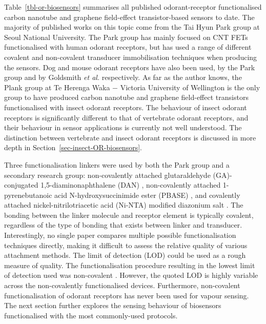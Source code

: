 \documentclass[
  a4paper,
]{scrbook}
\begin{document}
Table~\ref{tbl-or-biosensors} summarises all published odorant-receptor
functionalised carbon nanotube and graphene field-effect
transistor-based sensors to date. The majority of published works on
this topic come from the Tai Hyun Park group at Seoul National
University. The Park group has mainly focused on CNT FETs functionalised
with human odorant receptors, but has used a range of different covalent
and non-covalent transducer immobilisation techniques when producing the
sensors. Dog and mouse odorant receptors have also been used, by the
Park group and by Goldsmith \emph{et al.} respectively. As far as the
author knows, the Plank group at Te Herenga Waka \(-\) Victoria
University of Wellington is the only group to have produced carbon
nanotube and graphene field-effect transistors functionalised with
insect odorant receptors. The behaviour of insect odorant receptors is
significantly different to that of vertebrate odorant receptors, and
their behaviour in sensor applications is currently not well understood.
The distinction between vertebrate and insect odorant receptors is
discussed in more depth in Section~\ref{sec-insect-OR-biosensors}.

Three functionalisation linkers were used by both the Park group and a
secondary research group: non-covalently attached glutaraldehyde
(GA)-conjugated 1,5-diaminonaphthalene (DAN)
\autocite{Kwon2015,Goodwin2021}, non-covalently attached
1-pyrenebutanoic acid N-hydroxysuccinimide ester (PBASE)
\autocite{Murugathas2020,Yoo2022}, and covalently attached
nickel-nitrilotriacetic acid (Ni-NTA) modified diazonium salt
\autocite{Goldsmith2011,Son2017}. The bonding between the linker
molecule and receptor element is typically covalent, regardless of the
type of bonding that exists between linker and transducer.
Interestingly, no single paper compares multiple possible
functionalisation techniques directly, making it difficult to assess the
relative quality of various attachment methods. The limit of detection
(LOD) could be used as a rough measure of quality. The functionalisation
procedure resulting in the lowest limit of detection used was
non-covalent \autocite{Park2012}. However, the quoted LOD is highly
variable across the non-covalently functionalised devices. Furthermore,
non-covalent functionalisation of odorant receptors has never been used
for vapour sensing. The next section further explores the sensing
behaviour of biosensors functionalised with the most commonly-used
protocols.

\newpage
\thispagestyle{empty}
\end{document}
